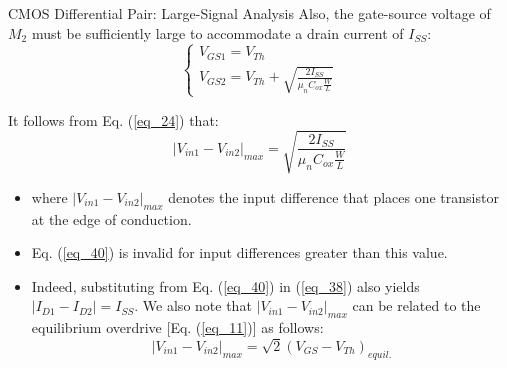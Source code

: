 \documentclass[10pt]{beamer}
\begin{document}
\begin{frame}{CMOS Differential Pair: Large-Signal Analysis}
     Also, the gate-source voltage of $M_{2}$ must be sufficiently large to accommodate a drain current of $I_{SS}$:
     \begin{equation}
         \begin{cases}
             V_{GS1} = V_{Th} \\
             V_{GS2} = V_{Th} + \sqrt{\frac{2 I_{SS}}{\mu_{n} C_{ox} \frac{W}{L}}}
         \end{cases}
         \label{eq_39}
     \end{equation}

     It follows from Eq. (\ref{eq_24}) that:
     \begin{equation}
         |V_{in1} - V_{in2}|_{max} = \sqrt{\frac{2 I_{SS}}{\mu_{n} C_{ox} \frac{W}{L}}}
         \label{eq_40}
     \end{equation}
     
     \begin{itemize}
         \item where $|V_{in1} - V_{in2}|_{max}$ denotes the input difference that places one transistor at the edge of conduction.
         \item Eq. (\ref{eq_40}) is invalid for input differences greater than this value.
         \item Indeed, substituting from Eq. (\ref{eq_40}) in (\ref{eq_38}) also yields $|I_{D1} - I_{D2}| = I_{SS}$. We also note that $|V_{in1} - V_{in2}|_{max}$ can be related to the equilibrium overdrive [Eq. (\ref{eq_11})] as follows:
         \begin{equation}
             |V_{in1} - V_{in2}|_{max} = \sqrt{2} (V_{GS} - V_{Th})_{equil.}
             \label{eq_41}
         \end{equation}
     \end{itemize}
\end{frame}
\end{document}
